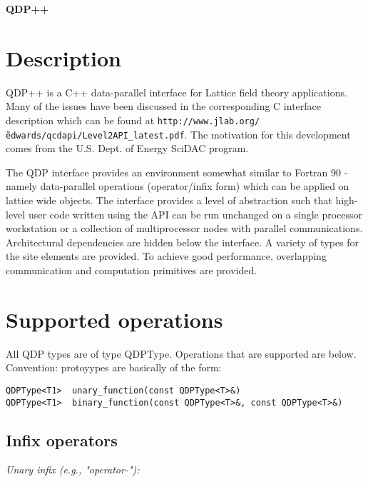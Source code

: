 \documentclass[12pt,letterpaper]{article}
\begin{document}
\pagestyle{empty} 
\begin{center}
{\bfseries\large QDP++}
\end{center}
\bigskip

\date{Sept. 25, 2002}

\section{Description}

QDP++ is a C++ data-parallel interface for Lattice field theory
applications. Many of the issues have been discussed in the
corresponding C interface description which can be found at
{\tt http://www.jlab.org/\~edwards/qcdapi/Level2API\_latest.pdf}. The
motivation for this development comes from the U.S. Dept. of Energy
SciDAC program.

The QDP interface provides an environment somewhat similar to 
Fortran 90 - namely data-parallel operations (operator/infix form)
which can be applied on lattice wide objects. The interface provides a
level of abstraction such that high-level user code written using the
API can be run unchanged on a single processor workstation or a
collection of multiprocessor nodes with parallel communications.
Architectural dependencies are hidden below the interface. A variety
of types for the site elements are provided. To achieve good
performance, overlapping communication and computation primitives are
provided.

\medskip

\section{Supported operations}

All QDP types are of type QDPType. Operations that are supported are below.
Convention: protoyypes are basically of the form:

\begin{verbatim}
QDPType<T1>  unary_function(const QDPType<T>&)
QDPType<T1>  binary_function(const QDPType<T>&, const QDPType<T>&)
\end{verbatim}

\medskip

\subsection{Infix operators}
\label{sec:infix}

\noindent
{\em Unary infix (e.g., "operator-"):}
\end{document}
